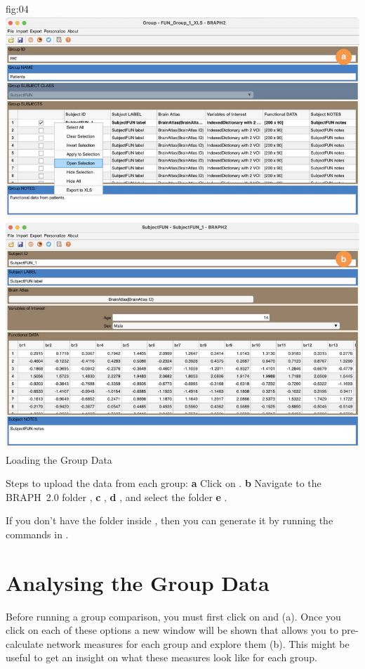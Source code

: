 \documentclass[justified]{tufte-handout}
\begin{document}
{{	
	{fig:04}
	{
	\includegraphics{fig04.jpg}
	}
	{Loading the Group Data}
	{
	Steps to upload the data from each group:
	{\bf a} Click on .
	{\bf b} Navigate to the BRAPH~2.0 folder , {\bf c} , {\bf d} , and select the folder {\bf e} .

If you don't have the  folder inside , then you can generate it by running the commands in .

\section{Analysing the Group Data}

Before running a group comparison, you must first click on  and  (a). Once you click on each of these options a new window will be shown that allows you to pre-calculate network measures for each group and explore them (b). This might be useful to get an insight on what these measures look like for each group.

}}}
\end{document}
